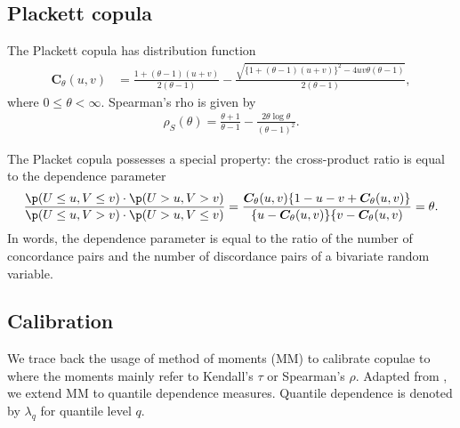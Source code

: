 \subsection{Plackett copula}\label{subsec:other-copula}
The Plackett copula has distribution function
\begin{align*}
    \bm{C}_{\theta}(u,v) &= \frac{1+(\theta-1)(u+v)}{2(\theta-1)}
                         - \frac{\sqrt{\{
    1+(\theta-1)(u+v)\}^2 - 4uv\theta(\theta-1)}}{2(\theta-1)},
\end{align*} where $0 \leq \theta < \infty$.
Spearman's rho is given by 
\begin{align*}
    \rho_S(\theta) = \frac{\theta+1}{\theta-1} - \frac{2\theta \log
  \theta}{(\theta-1)^2}. 
    \end{align*}

The Placket copula possesses a special property:
the cross-product ratio is equal to the dependence parameter
\begin{equation} \label{eq:PlackettCrossProduct}
    \frac{\p(U \leq u, V \leq v) \cdot \p(U > u, V > v)}
    {\p(U \leq u, V > v) \cdot \p(U > u, V \leq v)}\nonumber
    =
      \frac{\bm{C}_\theta(u,v)\{1-u-v+\bm{C}_\theta(u,v)\}}{\{u-\bm{C}_\theta(u,v)\}\{v-\bm{C}_\theta(u,v)}\nonumber 
    = \theta.
\end{equation}
In words, the dependence parameter is equal to the ratio of the 
number of concordance pairs and the number of discordance pairs of a 
bivariate random variable. 

\subsection{Calibration}\label{sec:estimation}
We trace back the usage of method of moments (MM) to calibrate copulae to \citet{Genest1987, genest1993statistical} 
where the moments mainly refer to Kendall's $\tau$ or Spearman's $\rho$.
Adapted from \cite{oh2013simulated}, we extend MM to quantile dependence measures. 
Quantile dependence is denoted by $\lambda_q$ for quantile level $q$.

